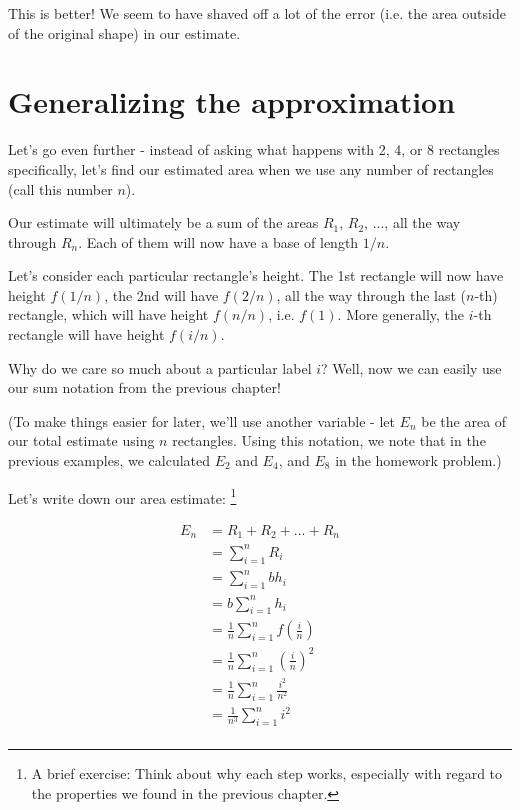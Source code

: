 \documentclass{article}
\begin{document}

This is better! We seem to have shaved off a lot of the error (i.e. the area outside of the original shape) in our estimate. 


\section{Generalizing the approximation}

Let's go even further - instead of asking what happens with 2, 4, or 8 rectangles specifically, let's find our estimated area when we use any number of rectangles (call this number $n$). 

Our estimate will ultimately be a sum of the areas $R_1$, $R_2$, ..., all the way through $R_n$. Each of them will now have a base of length $1/n$. 

Let's consider each particular rectangle's height. The 1st rectangle will now have height $f(1/n)$, the 2nd will have $f(2/n)$, all the way through the last ($n$-th) rectangle, which will have height $f(n/n)$, i.e. $f(1)$. More generally, the $i$-th rectangle will have height $f(i/n)$. 



Why do we care so much about a particular label $i$? Well, now we can easily use our sum notation from the previous chapter! 

(To make things easier for later, we'll use another variable - let $E_n$ be the area of our total estimate using $n$ rectangles. Using this notation, we note that in the previous examples, we calculated $E_2$ and $E_4$, and $E_8$ in the homework problem.)

Let's write down our area estimate: \footnote{A brief exercise: Think about why each step works, especially with regard to the properties we found in the previous chapter.}


\begin{align*}
E_n &= R_1 + R_2 + ... + R_n \\
&= \sum_{i=1}^n R_i \\
&= \sum_{i=1}^n b h_i \\
&= b \sum_{i=1}^n h_i \\
&= \frac{1}{n} \sum_{i=1}^n f(\frac{i}{n}) \\
&= \frac{1}{n} \sum_{i=1}^n \left(\frac{i}{n}\right)^2 \\
&= \frac{1}{n} \sum_{i=1}^n \frac{i^2}{n^2} \\
&= \frac{1}{n^3} \sum_{i=1}^n i^2 \\
\end{align*}
\end{document}
